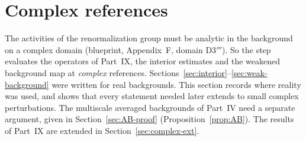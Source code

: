 \section{Complex references}\label{sec:complex-references}

The activities of the renormalization group must be analytic in the background on a complex domain (blueprint, Appendix~F, domain D3$'''$). So the step evaluates the operators of Part~IX, the interior estimates and the weakened background map at \emph{complex} references. Sections~\ref{sec:interior}--\ref{sec:weak-background} were written for real backgrounds. This section records where reality was used, and shows that every statement needed later extends to small complex perturbations. The multiscale averaged backgrounds of Part~IV need a separate argument, given in Section~\ref{sec:AB-proof} (Proposition~\ref{prop:AB}). The results of Part~IX are extended in Section~\ref{sec:complex-ext}.

